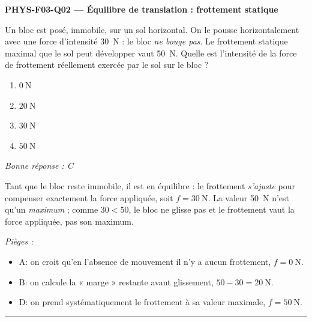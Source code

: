 \documentclass[11pt,a4paper]{article}
\newcommand{\vv}[1]{\vec{#1}}\newcommand{\ds}{\displaystyle}
\begin{document}
\noindent\textbf{PHYS-F03-Q02 --- Équilibre de translation : frottement statique}\par
Un bloc est posé, immobile, sur un sol horizontal. On le pousse horizontalement avec une force
d'intensité \qty{30}{\newton} : le bloc \emph{ne bouge pas}. Le frottement statique maximal que le sol
peut développer vaut \qty{50}{\newton}. Quelle est l'intensité de la force de frottement réellement
exercée par le sol sur le bloc ?
\begin{center}
\end{center}
\begin{enumerate}[label=\Alph*)]
\item $\qty{0}{\newton}$
\item $\qty{20}{\newton}$
\item $\qty{30}{\newton}$
\item $\qty{50}{\newton}$
\end{enumerate}
\textit{Bonne réponse : C}\par
Tant que le bloc reste immobile, il est en équilibre : le frottement \emph{s'ajuste} pour compenser
exactement la force appliquée, soit $f = \qty{30}{\newton}$. La valeur \qty{50}{\newton} n'est qu'un
\emph{maximum} ; comme $30 < 50$, le bloc ne glisse pas et le frottement vaut la force appliquée,
pas son maximum.\par
\textit{Pièges :}
\begin{itemize}
\item A: on croit qu'en l'absence de mouvement il n'y a aucun frottement, $f = \qty{0}{\newton}$.
\item B: on calcule la « marge » restante avant glissement, $50 - 30 = \qty{20}{\newton}$.
\item D: on prend systématiquement le frottement à sa valeur maximale, $f = \qty{50}{\newton}$.
\end{itemize}
\vspace{8pt}\hrule\vspace{8pt}
\end{document}
